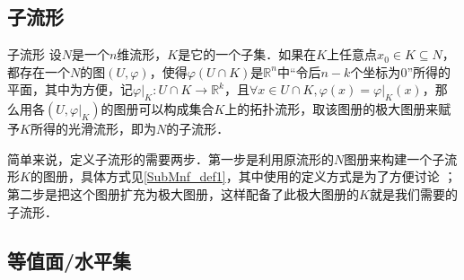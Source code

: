 

\subsection{子流形}

\begin{definition}{子流形}\label{SubMnf_def1}
设$N$是一个$n$维流形，$K$是它的一个子集．如果在$K$上任意点$x_0\in K\subseteq N$，都存在一个$N$的图$(U, \varphi)$，使得$\varphi (U\cap K)$是$\mathbb{R}^n$中“令后$n-k$个坐标为$0$”所得的平面，其中为方便，记$\varphi|_K:U\cap K\rightarrow\mathbb{R}^k$，且$\forall x\in U\cap K, \varphi(x)=\varphi|_K(x)$，那么用各$(U, \varphi|_K)$的图册可以构成集合$K$上的拓扑流形，取该图册的极大图册来赋予$K$所得的光滑流形，即为$N$的子流形．
\end{definition}

简单来说，定义子流形的需要两步．第一步是利用原流形的$N$图册来构建一个子流形$K$的图册，具体方式见\autoref{SubMnf_def1}，其中使用的定义方式是为了方便讨论 ；第二步是把这个图册扩充为极大图册，这样配备了此极大图册的$K$就是我们需要的子流形．


\subsection{等值面/水平集}%




